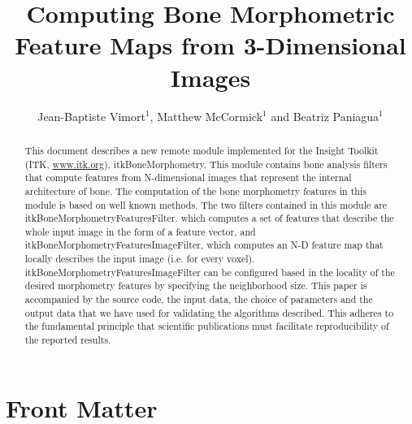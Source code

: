 \documentclass{InsightArticle}
\title{Computing Bone Morphometric Feature Maps from 3-Dimensional Images}
\author{Jean-Baptiste Vimort$^{1}$, Matthew McCormick$^{1}$ and Beatriz Paniagua$^{1}$}
\newcommand{\IJhandlerIDnumber}{3588}
\begin{document}
%
%
\IJhandlefooter{\IJhandlerIDnumber}


\ifpdf
\else
\fi

\maketitle

\ifhtml
\chapter*{Front Matter\label{front}}
\fi


\begin{abstract}
\noindent
This document describes a new remote module implemented for the Insight Toolkit (ITK,
  \url{www.itk.org}), itkBoneMorphometry. This module contains bone analysis filters that compute features from N-dimensional images that represent the internal architecture of bone. The computation of the bone morphometry features in this module is based on well known methods. The two filters contained in this module are itkBoneMorphometryFeaturesFilter. which computes a set of features that describe the whole input image in the form of a feature vector, and itkBoneMorphometryFeaturesImageFilter, which computes an N-D feature map that locally describes the input image (i.e. for every voxel). itkBoneMorphometryFeaturesImageFilter can be configured based in the locality of the desired morphometry features by specifying the neighborhood size. This paper is accompanied by the source code, the  input data, the choice of parameters and the output data that we have used for validating the algorithms described. This adheres to the fundamental principle that scientific publications must facilitate reproducibility of the reported results.

\end{abstract}
\end{document}
